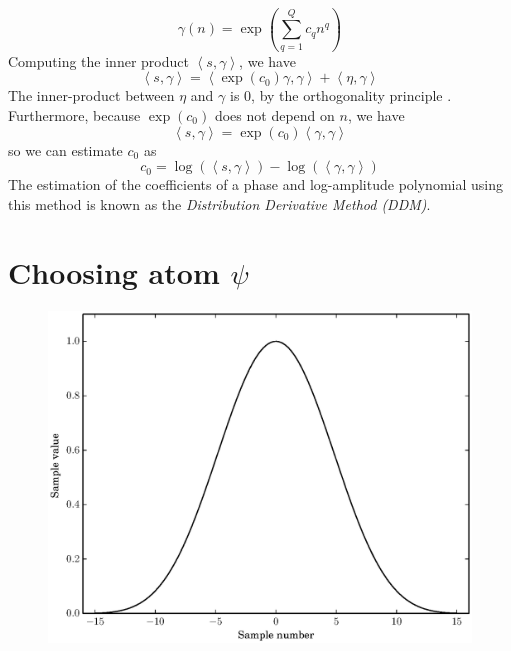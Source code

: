 \[
    \gamma(n) = \exp \left( \sum_{q=1}^{Q} c_q n^{q} \right)
\]
Computing the inner product $\left\langle s , \gamma \right\rangle$, we have
\[
    \left\langle s , \gamma \right\rangle
    =
    \left\langle \exp(c_0) \gamma , \gamma \right\rangle + 
        \left\langle \eta , \gamma \right\rangle
\]
The inner-product between $\eta$ and $\gamma$ is $0$, by the orthogonality
principle \cite[ch.~12]{kay1993fundamentals}. Furthermore, because $\exp(c_0)$ does not
depend on $n$, we have
\[
    \left\langle s , \gamma \right\rangle
    =
    \exp(c_0) \left\langle \gamma , \gamma \right\rangle
\]
so we can estimate $c_0$ as
\begin{equation}
    \label{eq:ddmestc0}
    c_0 = \log \left( \left\langle s , \gamma \right\rangle \right)
        - \log \left( \left\langle \gamma , \gamma \right\rangle \right)
\end{equation}
The estimation of the coefficients of a phase and log-amplitude polynomial
using this method is known as the \textit{Distribution Derivative Method (DDM)}.

\section{Choosing atom $\psi$ \label{sec:optblackman}}

\begin{figure}[!t]
    \centering
    \includegraphics[width=\figwidthscale\textwidth]{plots/min4_blackman_td.eps}
    \CaptionWithTitle{%
    }{\label{plot:opt_blackman}}
\end{figure}

